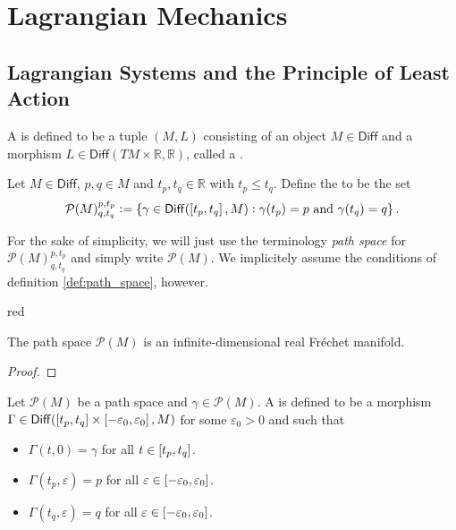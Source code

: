\chapter{Lagrangian Mechanics}
\section*{Lagrangian Systems and the Principle of Least Action}

\begin{definition}
	A  is defined to be a tuple $(M,L)$ consisting of an object $M \in \mathsf{Diff}$ and a morphism $L \in \mathsf{Diff}(TM \times \mathbb{R},\mathbb{R})$, called a .
\end{definition}

\begin{definition}
	\label{def:path_space}
	Let $M \in \mathsf{Diff}$, $p,q \in M$ and $t_p, t_q \in \mathbb{R}$ with $t_p \leq t_q$. Define the  to be the set
	\begin{equation}
		\label{eq:path_space}
		\mathcal{P}(M)^{p,t_p}_{q,t_q} := \cbr[0]{\gamma \in \mathsf{Diff}(\intcc[0]{t_p,t_q},M) : \gamma(t_p) = p \text{ and } \gamma(t_q) = q}.
			\end{equation}
\end{definition}

\begin{remark}
	For the sake of simplicity, we will just use the terminology \emph{path space} for $\mathcal{P}(M)^{p,t_p}_{q,t_q}$ and simply write $\mathcal{P}(M)$. We implicitely assume the conditions of definition \ref{def:path_space}, however.
\end{remark}

\begin{color}{red}
\begin{proposition}
	The path space $\mathcal{P}(M)$ is an infinite-dimensional real Fr\'echet manifold.
\end{proposition}

\begin{proof}
		
\end{proof}
\end{color}

\begin{definition}[Variation]
	Let $\mathcal{P}(M)$ be a path space and $\gamma \in \mathcal{P}(M)$. A  is defined to be a morphism $\Gamma \in \mathsf{Diff}(\intcc[0]{t_p,t_q} \times \intcc[0]{-\varepsilon_0,\varepsilon_0},M)$ for some $\varepsilon_0 > 0$ and such that
	\begin{itemize}[wide=0pt]
		\item $\Gamma(t,0) = \gamma$ for all $t \in \intcc[0]{t_p,t_q}$.
		\item $\Gamma(t_p,\varepsilon) = p$ for all $\varepsilon \in \intcc[0]{-\varepsilon_0,\varepsilon_0}$.
		\item $\Gamma(t_q,\varepsilon) = q$ for all $\varepsilon \in \intcc[0]{-\varepsilon_0,\varepsilon_0}$.
	\end{itemize}
\end{definition}

